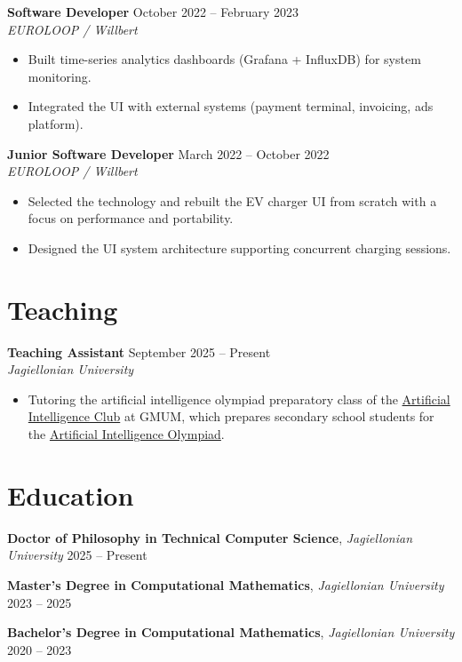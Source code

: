 \documentclass[11pt,a4paper]{article}
\begin{document}
\noindent\textbf{Software Developer} \hfill {\small\color{graytext} October 2022 -- February 2023}\\
\textit{EUROLOOP / Willbert}\par
\begin{itemize}[leftmargin=1.2em,topsep=0.5pt,itemsep=0.3pt,parsep=0pt]
  \item Built time-series analytics dashboards (Grafana + InfluxDB) for system monitoring.
  \item Integrated the UI with external systems (payment terminal, invoicing, ads platform).
\end{itemize}
\vspace{0.5pt}
\noindent\textbf{Junior Software Developer} \hfill {\small\color{graytext} March 2022 -- October 2022}\\
\textit{EUROLOOP / Willbert}\par
\begin{itemize}[leftmargin=1.2em,topsep=0.5pt,itemsep=0.3pt,parsep=0pt]
  \item Selected the technology and rebuilt the EV charger UI from scratch with a focus on performance and portability.
  \item Designed the UI system architecture supporting concurrent charging sessions.
\end{itemize}
\vspace{0.5pt}
\section*{Teaching}
\noindent\textbf{Teaching Assistant} \hfill {\small\color{graytext} September 2025 -- Present}\\
\textit{Jagiellonian University}\par
\begin{itemize}[leftmargin=1.2em,topsep=0.5pt,itemsep=0.3pt,parsep=0pt]
  \item Tutoring the artificial intelligence olympiad preparatory class of the \href{https://gmum.net/ai-scientific-club/}{Artificial Intelligence Club} at GMUM, which prepares secondary school students for the \href{https://www.oai.edu.pl/}{Artificial Intelligence Olympiad}.
\end{itemize}
\vspace{0.5pt}
\section*{Education}
\noindent\textbf{Doctor of Philosophy in Technical Computer Science}, \textit{Jagiellonian University} \hfill {\small\color{graytext} 2025 -- Present}\par\vspace{2pt}
\noindent\textbf{Master's Degree in Computational Mathematics}, \textit{Jagiellonian University} \hfill {\small\color{graytext} 2023 -- 2025}\par\vspace{2pt}
\noindent\textbf{Bachelor's Degree in Computational Mathematics}, \textit{Jagiellonian University} \hfill {\small\color{graytext} 2020 -- 2023}\par\vspace{2pt}
\end{document}
